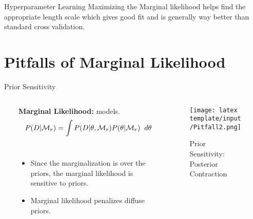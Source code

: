 \documentclass[t, aspectratio=169]{beamer}
\begin{document}
\begin{frame}{Hyperparameter Learning}
\vspace{0.5cm}
Maximizing the Marginal likelihood helps find the appropriate length scale which gives good fit and is generally way better than standard cross validation.

\vspace{0.3cm}
\centering
\end{frame}
 
 
\section{Pitfalls of Marginal Likelihood}

 
\begin{frame}{Prior Sensitivity}
 \begin{columns}[onlytextwidth]\

\begin{column}{0.5\textwidth}
\textbf{Marginal Likelihood:}
models.\\
\vspace{1.5cm}
  \[P(D|\mathcal{M}_r) = \int P(D|\theta,\mathcal{M}_r) P(\theta|\mathcal{M}_r)\hspace{0.2cm} d\theta \]\\
  \vspace{2.5cm}
  \begin{itemize}
      \item Since the marginalization is over the priors, the marginal likelihood is sensitive to priors.
       \vspace{0.6cm}
      \item Marginal likelihood penalizes diffuse priors.

  \end{itemize}


\end{column}



   \begin{column}{.5\textwidth}
   \begin{figure}
       \centering
       \texttt{[image: latex template/input/Pitfall2.png]}
       \caption{Prior Sensitivity: Posterior Contraction \cite{Lofti}}
      
   \end{figure}
   \end{column}
 \end{columns}
 \end{frame} 
 
\end{document}
